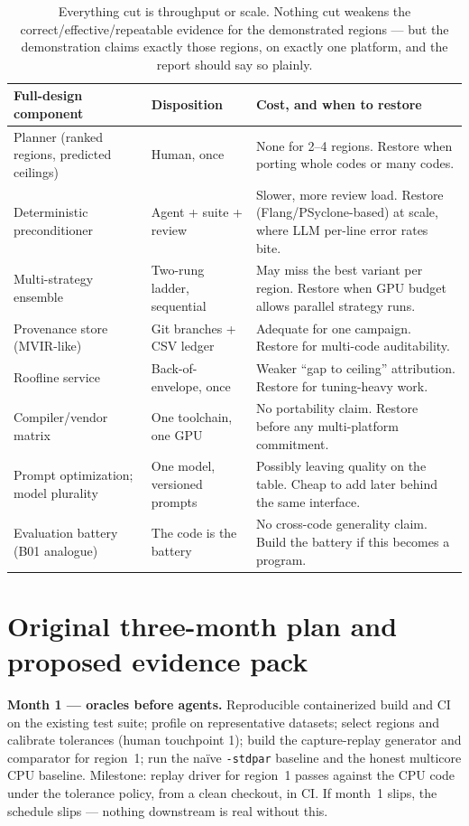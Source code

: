 \documentclass[11pt]{article}
\begin{document}
\begin{table}[htbp]
\centering\small
\begin{tabular}{@{}p{}p{}p{}@{}}
\toprule
\textbf{Full-design component} & \textbf{Disposition} & \textbf{Cost, and when to restore} \\
\midrule
Planner (ranked regions, predicted ceilings) & Human, once & None for 2--4 regions. Restore when porting whole codes or many codes. \\
Deterministic preconditioner & Agent + suite + review & Slower, more review load. Restore (Flang/PSyclone-based) at scale, where LLM per-line error rates bite. \\
Multi-strategy ensemble & Two-rung ladder, sequential & May miss the best variant per region. Restore when GPU budget allows parallel strategy runs. \\
Provenance store (MVIR-like) & Git branches + CSV ledger & Adequate for one campaign. Restore for multi-code auditability. \\
Roofline service & Back-of-envelope, once & Weaker ``gap to ceiling'' attribution. Restore for tuning-heavy work. \\
Compiler/vendor matrix & One toolchain, one GPU & No portability claim. Restore before any multi-platform commitment. \\
Prompt optimization; model plurality & One model, versioned prompts & Possibly leaving quality on the table. Cheap to add later behind the same interface. \\
Evaluation battery (B01 analogue) & The code is the battery & No cross-code generality claim. Build the battery if this becomes a program. \\
\bottomrule
\end{tabular}
\caption{Everything cut is throughput or scale. Nothing cut weakens the correct/effective/repeatable evidence for the demonstrated regions --- but the demonstration claims exactly those regions, on exactly one platform, and the report should say so plainly.}
\label{tab:cuts}
\end{table}

\section{Original three-month plan and proposed evidence pack}

\textbf{Month 1 --- oracles before agents.} Reproducible containerized build and CI on the existing test suite; profile on representative datasets; select regions and calibrate tolerances (human touchpoint 1); build the capture-replay generator and comparator for region~1; run the na\"ive \texttt{-stdpar} baseline and the honest multicore CPU baseline. Milestone: replay driver for region~1 passes against the CPU code under the tolerance policy, from a clean checkout, in CI. If month~1 slips, the schedule slips --- nothing downstream is real without this.
\end{document}
